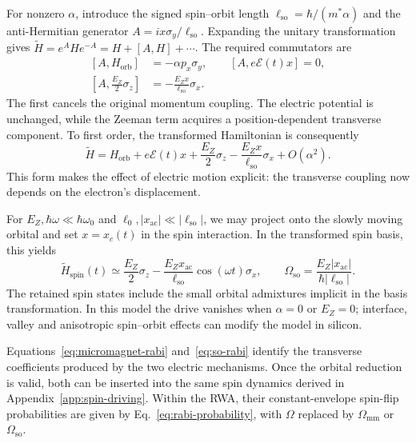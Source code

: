 For nonzero $\alpha$, introduce the signed spin--orbit length
$\ell_{\mathrm{so}}=\hbar/(m^*\alpha)$ and the anti-Hermitian
generator $A=ix\sigma_y/\ell_{\mathrm{so}}$.
Expanding the unitary transformation gives
$\widetilde H=e^AHe^{-A}=H+[A,H]+\cdots$.
The required commutators are
\begin{equation}
 \begin{aligned}
 [A,H_{\mathrm{orb}}]&=-\alpha p_x\sigma_y,\qquad
 [A,e\mathcal E(t)x]=0,\\
 \left[A,\frac{E_Z}{2}\sigma_z\right]
     &=-\frac{E_Zx}{\ell_{\mathrm{so}}}\sigma_x.
 \end{aligned}
 \label{eq:so-commutators}
\end{equation}
The first cancels the original momentum coupling. The electric
potential is unchanged, while the Zeeman term acquires a
position-dependent transverse component. To first order, the
transformed Hamiltonian is consequently
\begin{equation}
 \widetilde H=H_{\mathrm{orb}}+e\mathcal E(t)x
      +\frac{E_Z}{2}\sigma_z
      -\frac{E_Zx}{\ell_{\mathrm{so}}}\sigma_x+O(\alpha^2).
 \label{eq:so-transformed}
\end{equation}
This form makes the effect of electric motion explicit: the
transverse coupling now depends on the electron's displacement.

For $E_Z,\hbar\omega\ll\hbar\omega_0$ and
$\ell_0,|x_{\mathrm{ac}}|\ll|\ell_{\mathrm{so}}|$, we may project
onto the slowly moving orbital and set $x=x_c(t)$ in the spin
interaction. In the transformed spin basis, this yields
\begin{equation}
 \widetilde H_{\mathrm{spin}}(t)\simeq\frac{E_Z}{2}\sigma_z
  -\frac{E_Z x_{\mathrm{ac}}}{\ell_{\mathrm{so}}}
       \cos(\omega t)\sigma_x,\qquad
 \Omega_{\mathrm{so}}=\frac{E_Z|x_{\mathrm{ac}}|}
                        {\hbar|\ell_{\mathrm{so}}|}.
 \label{eq:so-rabi}
\end{equation}
The retained spin states include the small orbital admixtures
implicit in the basis transformation. In this model the drive
vanishes when $\alpha=0$ or $E_Z=0$; interface, valley and
anisotropic spin--orbit effects can modify the model in silicon.

Equations~\eqref{eq:micromagnet-rabi} and~\eqref{eq:so-rabi}
identify the transverse coefficients produced by the two electric
mechanisms. Once the orbital reduction is valid, both can be
inserted into the same spin dynamics derived in
Appendix~\ref{app:spin-driving}. Within the RWA, their
constant-envelope spin-flip probabilities are given by
Eq.~\eqref{eq:rabi-probability}, with $\Omega$ replaced by
$\Omega_{\mathrm{mm}}$ or $\Omega_{\mathrm{so}}$.

